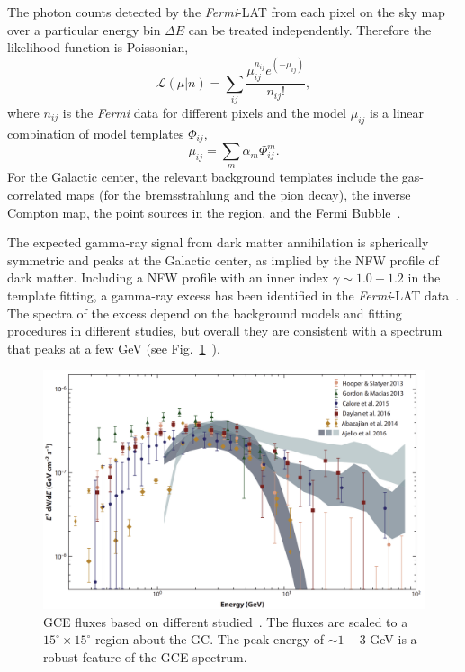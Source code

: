 \documentclass[doublespace,nopageskip]{VTthesis} %
\begin{document}
The photon counts detected by the \textit{Fermi}-LAT from each pixel on the sky map over a particular energy bin $\Delta E$ can be treated independently. Therefore the likelihood function is Poissonian,
\begin{equation}
    \mathcal{L}(\mu|n)= \sum_{ij}\frac{\mu_{ij}^{n_{ij}}e^{(-\mu_{ij})}}{n_{ij}!},
\end{equation}
where $n_{ij}$ is the \textit{Fermi} data for different pixels and the model $\mu_{ij}$ is a linear combination of model templates $\Phi_{ij}$,
\begin{equation}
    \mu_{ij} = \sum_m \alpha_m \Phi^m_{ij}.
\end{equation}
For the Galactic center, the relevant background templates include the gas-correlated maps (for the bremsstrahlung and the pion decay), the inverse Compton map, the point sources in the region, and the Fermi Bubble~\cite{2010ApJ...724.1044S}.

The expected gamma-ray signal from dark matter annihilation is spherically symmetric and peaks at the Galactic center, as implied by the NFW profile of dark matter. Including a NFW profile with an inner index $\gamma \sim 1.0 - 1.2$ in the template fitting, a gamma-ray excess has been identified in the \textit{Fermi}-LAT data~\cite{2009arXiv0910.2998G, 2009arXiv0912.3828V,2011PhLB..697..412H,2012PhRvD..86h3511A,2013PhRvD..88h3521G,2014PhRvD..89f3515M,2013PDU.....2..118H,2014PhRvD..90b3526A,2016PDU....12....1D,2015JCAP...03..038C,2015PhRvD..91l3010Z,2016ApJ...819...44A,2017ApJ...840...43A}. The spectra of the excess depend on the background models and fitting procedures in different studies, but overall they are consistent with a spectrum that peaks at a few GeV (see Fig.~\ref{fig:gce_spectra}~\cite{Murgia:2020dzu}).
\begin{figure}[htb]
    \centering
    \includegraphics[width=\textwidth]{Figures/Intro/gcespectrum.png}
    \caption{GCE fluxes based on different studied~\cite{Murgia:2020dzu}. The fluxes are scaled to a $15^\circ \times 15^\circ$ region about the GC. The peak energy of $\sim 1 - 3$ GeV is a robust feature of the GCE spectrum.}
    \label{fig:gce_spectra}
\end{figure}
\end{document}

